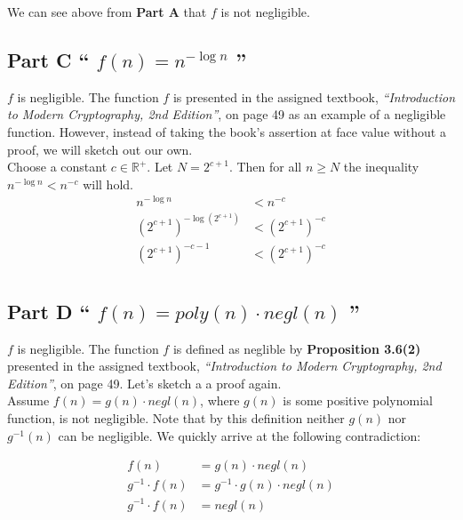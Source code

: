 \documentclass{article}
\newcommand{\HomeworkText}[1]{\textbf{``#1''}\\}
\begin{document}
	We can see above from \textbf{Part A} that $f$ is not negligible.
	
	\subsection*{Part C
	\HomeworkText{
		$f(n) = n^{-\log n}$
	}}

	$f$ is negligible. The function $f$ is presented in the assigned textbook, \emph{``Introduction to Modern Cryptography, 2nd Edition''}, on page 49 as an example of a negligible function. However, instead of taking the book's assertion at face value without a proof, we will sketch out our own.\\
	
	Choose a constant $c \in \mathbb{R}^{+}$. Let $N = 2^{c+1}$. Then for all $n \ge N$ the inequality $n^{-\log n} < n^{-c}$ will hold.\\
	
	\begin{equation}
	\begin{split}
	  	n^{-\log n} & < n^{-c} \\
	  	(2^{c+1})^{-\log(2^{c+1})} & < (2^{c+1})^{-c} \\
	    (2^{c+1})^{-c - 1} & < (2^{c+1})^{-c} \\
	\end{split}
	\end{equation}


	\subsection*{Part D
	\HomeworkText{
		$f(n) = poly(n) \cdot negl(n)$
	}}

	$f$ is negligible. The function $f$ is defined as neglible by \textbf{Proposition 3.6(2)} presented in the assigned textbook, \emph{``Introduction to Modern Cryptography, 2nd Edition''}, on page 49. Let's sketch a a proof again.\\
	
	Assume $f(n) = g(n) \cdot negl(n)$, where $g(n)$ is some positive polynomial function, is not negligible. Note that by this definition neither $g(n)$ nor $g^{-1}(n)$ can be negligible. We quickly arrive at the following contradiction:
	
	\begin{equation}
	\begin{split}
	f(n) & = g(n) \cdot negl(n) \\
	g^{-1} \cdot f(n) & = g^{-1} \cdot g(n) \cdot negl(n) \\
	g^{-1} \cdot f(n) & = negl(n) \\
	\end{split}
	\end{equation}
	
\end{document}
